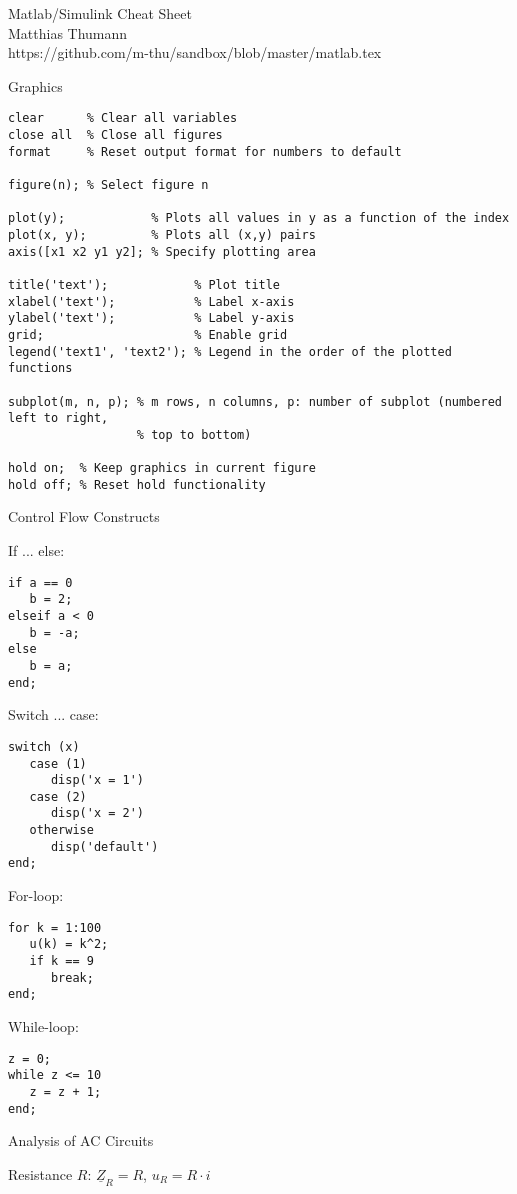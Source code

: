 \documentclass[a4paper,fontsize=11pt,parskip]{scrartcl}
\begin{document}
{\Huge Matlab/Simulink Cheat Sheet}\\
{\large Matthias Thumann}\\
{\large https://github.com/m-thu/sandbox/blob/master/matlab.tex}


{\Large Graphics}


\begin{lstlisting}
clear      % Clear all variables
close all  % Close all figures
format     % Reset output format for numbers to default

figure(n); % Select figure n

plot(y);            % Plots all values in y as a function of the index
plot(x, y);         % Plots all (x,y) pairs
axis([x1 x2 y1 y2]; % Specify plotting area

title('text');            % Plot title
xlabel('text');           % Label x-axis
ylabel('text');           % Label y-axis
grid;                     % Enable grid
legend('text1', 'text2'); % Legend in the order of the plotted functions

subplot(m, n, p); % m rows, n columns, p: number of subplot (numbered left to right,
                  % top to bottom)

hold on;  % Keep graphics in current figure
hold off; % Reset hold functionality
\end{lstlisting}


{\Large Control Flow Constructs}

If ... else:
\begin{lstlisting}
if a == 0
   b = 2;
elseif a < 0
   b = -a;
else
   b = a;
end;
\end{lstlisting}

Switch ... case:
\begin{lstlisting}
switch (x)
   case (1)
      disp('x = 1')
   case (2)
      disp('x = 2')
   otherwise
      disp('default')
end;
\end{lstlisting}

For-loop:
\begin{lstlisting}
for k = 1:100
   u(k) = k^2;
   if k == 9
      break;
end;
\end{lstlisting}

While-loop:
\begin{lstlisting}
z = 0;
while z <= 10
   z = z + 1;
end;
\end{lstlisting}

{\Large Analysis of AC Circuits}

Resistance $R$: $\underline Z_R = R$, $u_R = R\cdot i$
\end{document}

